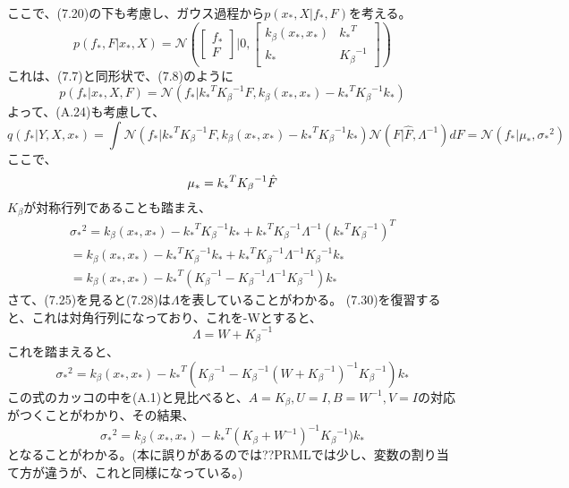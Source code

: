 ﻿\documentclass{jsarticle}
\begin{document}
ここで、(7.20)の下も考慮し、ガウス過程から$p(x_*, X | f_*, F)$を考える。
\begin{equation}
p(f_*, F | x_*, X) = \mathcal{N} \left( \left[
\begin{matrix}
f_*\\
F
\end{matrix}
\right] | 0, 
\left[
\begin{matrix}
k_\beta(x_*, x_*) & {k_*}^T\\
k_* & {K_\beta}^{-1}
\end{matrix}
\right] \right)
\end{equation}
これは、(7.7)と同形状で、(7.8)のように
\begin{equation}
p(f_* | x_*, X, F) = \mathcal{N} ( f_* | {k_*}^T {K_{\beta}}^{-1}F, k_\beta(x_*, x_*)
- {k_*}^T {K_{\beta}}^{-1} k_*)
\end{equation}
よって、(A.24)も考慮して、
\begin{equation}
q(f_* | Y, X, x_*) = \int \mathcal{N} ( f_* | {k_*}^T {K_{\beta}}^{-1}F, k_\beta(x_*, x_*)
- {k_*}^T {K_{\beta}}^{-1} k_*) \mathcal{N}(F | \hat{F}, \Lambda^{-1}) dF
= \mathcal{N} ( f_* | \mu_*, {\sigma_*}^2)
\end{equation}
ここで、
\begin{equation}
\mu_* = {k_*}^T {K_{\beta}}^{-1} \hat{F}\\
\end{equation}
$K_\beta$が対称行列であることも踏まえ、
\begin{equation}
\begin{split}
{\sigma_*}^2 = k_\beta(x_*, x_*) - {k_*}^T {K_{\beta}}^{-1} k_* + {k_*}^T {K_{\beta}}^{-1} \Lambda^{-1}({k_*}^T {K_{\beta}}^{-1})^T\\
= k_\beta(x_*, x_*) - {k_*}^T {K_{\beta}}^{-1} k_* + {k_*}^T {K_{\beta}}^{-1} \Lambda^{-1} {K_{\beta}}^{-1} k_*\\
= k_\beta(x_*, x_*) - {k_*}^T ({K_{\beta}}^{-1} - {K_{\beta}}^{-1} \Lambda^{-1} {K_{\beta}}^{-1} )k_*
\end{split}
\end{equation}
さて、(7.25)を見ると(7.28)は$\Lambda$を表していることがわかる。
(7.30)を復習すると、これは対角行列になっており、これを-Wとすると、
\begin{equation}
\Lambda = W + {K_\beta}^{-1}
\end{equation}
これを踏まえると、
\begin{equation}
{\sigma_*}^2 = k_\beta(x_*, x_*) - {k_*}^T ({K_{\beta}}^{-1} - {K_{\beta}}^{-1} (W + {K_\beta}^{-1})^{-1} {K_{\beta}}^{-1} )k_*
\end{equation}
この式のカッコの中を(A.1)と見比べると、$A = K_{\beta}, U = I, B = W^{-1}, V = I$の対応がつくことがわかり、その結果、
\begin{equation}
{\sigma_*}^2 = k_\beta(x_*, x_*) - {k_*}^T ({K_\beta} + W^{-1})^{-1} {K_{\beta}}^{-1} )k_*
\end{equation}
となることがわかる。(本に誤りがあるのでは??PRMLでは少し、変数の割り当て方が違うが、これと同様になっている。)
\end{document}
